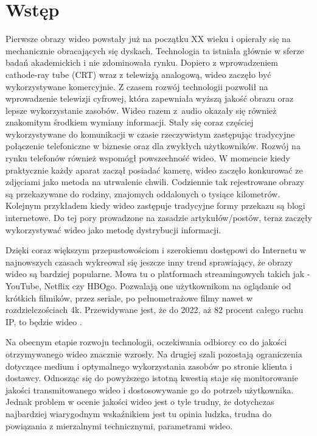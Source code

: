 \chapter{Wstęp}
\label{cha:pierwszyDokument}


Pierwsze obrazy wideo powstały już na początku XX wieku i opierały się na mechanicznie obracających się dyskach. Technologia ta istniała głównie w sferze badań akademickich i nie zdominowała rynku. Dopiero z wprowadzeniem cathode-ray tube (CRT) wraz z telewizją analogową, wideo zaczęło być wykorzystywane komercyjnie. Z czasem rozwój technologii pozwolił na wprowadzenie telewizji cyfrowej, która zapewniała wyższą jakość obrazu oraz lepsze wykorzystanie zasobów. Wideo razem z~audio okazały się również znakomitym środkiem wymiany informacji. Stały się coraz częściej wykorzystywane do komunikacji w czasie rzeczywistym zastępując tradycyjne połączenie telefoniczne w biznesie oraz dla zwykłych użytkowników. Rozwój na rynku telefonów również wspomógł powszechność wideo. W momencie kiedy praktycznie każdy aparat zaczął posiadać kamerę, wideo zaczęło konkurować ze zdjęciami jako metoda na utrwalenie chwili. Codziennie tak rejestrowane obrazy są przekazywane do rodziny, znajomych oddalonych o tysiące kilometrów. Kolejnym przykładem kiedy wideo zastępuje tradycyjne formy przekazu są blogi internetowe. Do tej pory prowadzone na zasadzie artykułów/postów, teraz zaczęły wykorzystywać wideo jako metodę dystrybucji informacji.

Dzięki coraz większym przepustowościom i szerokiemu dostępowi do Internetu w najnowszych czasach wykreował się jeszcze inny trend sprawiający, że obrazy wideo są bardziej popularne. Mowa tu o platformach streamingowych takich jak - YouTube, Netflix czy HBOgo. Pozwalają one użytkownikom na oglądanie od krótkich filmików, przez seriale, po pełnometrażowe filmy nawet w rozdzielczościach 4k. Przewidywane jest, że do 2022, aż 82 procent całego ruchu IP, to będzie wideo \cite{prediction}. \par



Na obecnym etapie rozwoju technologii, oczekiwania odbiorcy co do jakości otrzymywanego wideo znacznie wzrosły. Na drugiej szali pozostają ograniczenia dotyczące medium i optymalnego wykorzystania zasobów po stronie klienta i dostawcy. Odnosząc się do powyższego istotną kwestią staje się monitorowanie jakości transmitowanego wideo i dostosowywanie go do potrzeb użytkownika. Jednak problem w ocenie jakości wideo jest o tyle trudny, że dotychczas najbardziej wiarygodnym wskaźnikiem jest tu opinia ludzka,  trudna do powiązania z mierzalnymi technicznymi, parametrami wideo.\par

